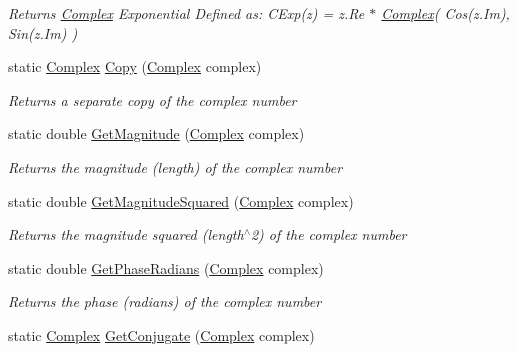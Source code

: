 \begin{DoxyCompactItemize}
\begin{DoxyCompactList}\small\item\em Returns \mbox{\hyperlink{struct_c_s_i_1_1_library_1_1_data_types_1_1_complex}{Complex}} Exponential Defined as\+: C\+Exp(z) = z.\+Re $\ast$ \mbox{\hyperlink{struct_c_s_i_1_1_library_1_1_data_types_1_1_complex}{Complex}}( Cos(z.\+Im), Sin(z.\+Im) ) \end{DoxyCompactList}\item 
static \mbox{\hyperlink{struct_c_s_i_1_1_library_1_1_data_types_1_1_complex}{Complex}} \mbox{\hyperlink{struct_c_s_i_1_1_library_1_1_data_types_1_1_complex_a9b5f9e9903acb5696a08df8171b51b6c}{Copy}} (\mbox{\hyperlink{struct_c_s_i_1_1_library_1_1_data_types_1_1_complex}{Complex}} complex)
\begin{DoxyCompactList}\small\item\em Returns a separate copy of the complex number \end{DoxyCompactList}\item 
static double \mbox{\hyperlink{struct_c_s_i_1_1_library_1_1_data_types_1_1_complex_a55d1594b34a93a2f0a1c676085a177f9}{Get\+Magnitude}} (\mbox{\hyperlink{struct_c_s_i_1_1_library_1_1_data_types_1_1_complex}{Complex}} complex)
\begin{DoxyCompactList}\small\item\em Returns the magnitude (length) of the complex number \end{DoxyCompactList}\item 
static double \mbox{\hyperlink{struct_c_s_i_1_1_library_1_1_data_types_1_1_complex_aafad62d0a28ec44bc2bd30b63cce89ae}{Get\+Magnitude\+Squared}} (\mbox{\hyperlink{struct_c_s_i_1_1_library_1_1_data_types_1_1_complex}{Complex}} complex)
\begin{DoxyCompactList}\small\item\em Returns the magnitude squared (length$^\wedge$2) of the complex number \end{DoxyCompactList}\item 
static double \mbox{\hyperlink{struct_c_s_i_1_1_library_1_1_data_types_1_1_complex_a2984f22ff552ffa68f13f2b3d0d89ecc}{Get\+Phase\+Radians}} (\mbox{\hyperlink{struct_c_s_i_1_1_library_1_1_data_types_1_1_complex}{Complex}} complex)
\begin{DoxyCompactList}\small\item\em Returns the phase (radians) of the complex number \end{DoxyCompactList}\item 
static \mbox{\hyperlink{struct_c_s_i_1_1_library_1_1_data_types_1_1_complex}{Complex}} \mbox{\hyperlink{struct_c_s_i_1_1_library_1_1_data_types_1_1_complex_aebdc6dc8b3f0fc043388007288cc361a}{Get\+Conjugate}} (\mbox{\hyperlink{struct_c_s_i_1_1_library_1_1_data_types_1_1_complex}{Complex}} complex)

\end{DoxyCompactItemize}
